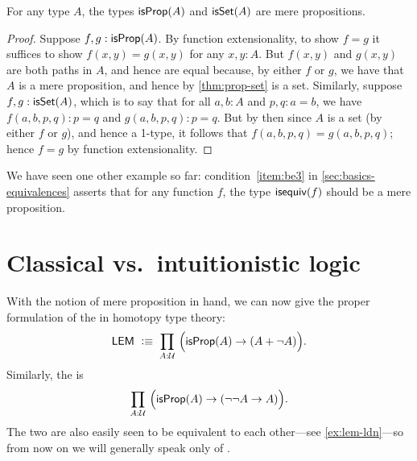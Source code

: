 \begin{lem}\label{thm:isprop-isprop}\label{thm:isprop-isset}
  For any type $A$, the types $\mathsf{isProp}(A)$ and $\mathsf{isSet}(A)$ are mere propositions.
\end{lem}
\begin{proof}
  Suppose $f,g:\mathsf{isProp}(A)$.  By function extensionality, to show $f=g$ it
  suffices to show $f(x,y)=g(x,y)$ for any $x,y:A$.  But $f(x,y)$ and $g(x,y)$
  are both paths in $A$, and hence are equal because, by either $f$ or $g$, we
  have that $A$ is a mere proposition, and hence by \autoref{thm:prop-set} is a
  set.  Similarly, suppose $f,g:\mathsf{isSet}(A)$, which is to say that for all
  $a,b:A$ and $p,q:a=b$, we have $f(a,b,p,q):p=q$ and $g(a,b,p,q):p=q$.  But by then since $A$ is a set (by
  either $f$ or $g$), and hence a 1-type, it follows that $f(a,b,p,q)=g(a,b,p,q)$; hence $f=g$ by
  function extensionality.
\end{proof}

We have seen one other example so far: condition~\ref{item:be3} in \autoref{sec:basics-equivalences} asserts that for any function $f$, the type $\mathsf{isequiv} (f)$ should be a mere proposition.

%
%

\section{Classical vs.\ intuitionistic logic}
\label{sec:intuitionism}

%
%
With the notion of mere proposition in hand, we can now give the proper formulation of the 
%
%
%
in homotopy type theory:
\begin{equation}
  \label{eq:lem}
  \LEM{}\;\defeq\;
  \prd{A:\UU} \Big(\isprop(A) \to (A + \neg A)\Big).
\end{equation}
Similarly, the 
%
%
%
is
\begin{equation}
  \label{eq:ldn}
  \prd{A:\UU} \Big(\isprop(A) \to (\neg\neg A \to A)\Big).
\end{equation}
The two are also easily seen to be equivalent to each other---see \autoref{ex:lem-ldn}---so from now on we will generally speak only of \LEM{}.

